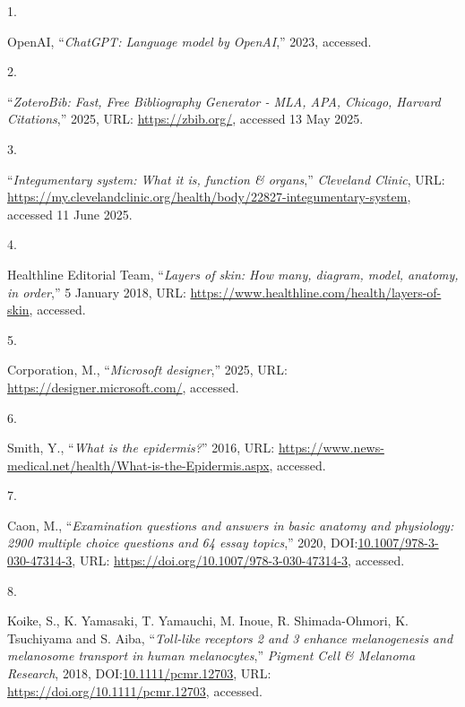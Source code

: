 \documentclass[
]{article}
\newlength{\cslhangindent}
\newlength{\csllabelwidth}
\newenvironment{CSLReferences}[2] %
 {\begin{list}{}{%
  \setlength{\itemindent}{0pt}
  \setlength{\leftmargin}{0pt}
  \setlength{\parsep}{0pt}
  \ifodd #1
   \setlength{\leftmargin}{\cslhangindent}
   \setlength{\itemindent}{-1\cslhangindent}
  \fi
  \setlength{\itemsep}{#2\baselineskip}}}
 {\end{list}}
\newcommand{\CSLLeftMargin}[1]{\parbox[t]{\csllabelwidth}{\strut#1\strut}}
\newcommand{\CSLRightInline}[1]{\parbox[t]{\linewidth - \csllabelwidth}{\strut#1\strut}}
\begin{document}
\label{refs}
\begin{CSLReferences}{0}{1}
\CSLLeftMargin{1. }%
\CSLRightInline{OpenAI, {``\emph{ChatGPT: Language model by OpenAI},''}
2023, accessed.}

\CSLLeftMargin{2. }%
\CSLRightInline{{``\emph{{ZoteroBib: Fast, Free Bibliography Generator -
MLA, APA, Chicago, Harvard Citations}},''} 2025, URL:
\url{https://zbib.org/}, accessed 13 May 2025.}

\CSLLeftMargin{3. }%
\CSLRightInline{{``\emph{Integumentary system: What it is, function \&
organs},''} \emph{Cleveland Clinic}, URL:
\url{https://my.clevelandclinic.org/health/body/22827-integumentary-system},
accessed 11 June 2025.}

\CSLLeftMargin{4. }%
\CSLRightInline{Healthline Editorial Team, {``\emph{Layers of skin: How
many, diagram, model, anatomy, in order},''} 5 January 2018, URL:
\url{https://www.healthline.com/health/layers-of-skin}, accessed.}

\CSLLeftMargin{5. }%
\CSLRightInline{Corporation, M., {``\emph{Microsoft designer},''} 2025,
URL: \url{https://designer.microsoft.com/}, accessed.}

\CSLLeftMargin{6. }%
\CSLRightInline{Smith, Y., {``\emph{What is the epidermis?}''} 2016,
URL:
\url{https://www.news-medical.net/health/What-is-the-Epidermis.aspx},
accessed.}

\CSLLeftMargin{7. }%
\CSLRightInline{Caon, M., {``\emph{Examination questions and answers in
basic anatomy and physiology: 2900 multiple choice questions and 64
essay topics},''} 2020,
DOI:\href{https://doi.org/10.1007/978-3-030-47314-3}{10.1007/978-3-030-47314-3},
URL: \url{https://doi.org/10.1007/978-3-030-47314-3}, accessed.}

\CSLLeftMargin{8. }%
\CSLRightInline{Koike, S., K. Yamasaki, T. Yamauchi, M. Inoue, R.
Shimada-Ohmori, K. Tsuchiyama and S. Aiba, {``\emph{Toll-like receptors
2 and 3 enhance melanogenesis and melanosome transport in human
melanocytes},''} \emph{Pigment Cell \& Melanoma Research}, 2018,
DOI:\href{https://doi.org/10.1111/pcmr.12703}{10.1111/pcmr.12703}, URL:
\url{https://doi.org/10.1111/pcmr.12703}, accessed.}


\end{CSLReferences}
\end{document}
